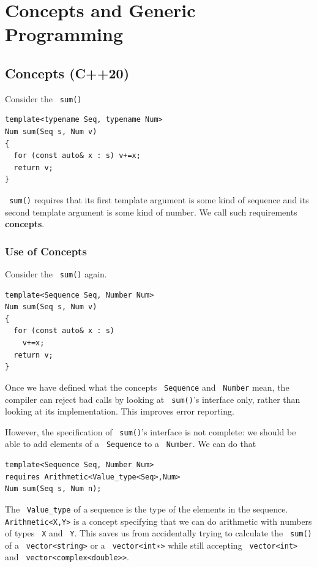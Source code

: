 \documentclass[11pt]{article}
\let\OldTexttt\texttt
\renewcommand{\texttt}[1]{\OldTexttt{\color{MidnightBlue} #1}}
\begin{document}
\section{Concepts and Generic Programming}
\label{sec:orgb7b7f2f}
\subsection{Concepts (C++20)}
\label{sec:orgdc95c83}
Consider the \texttt{sum()}
\begin{verbatim}
template<typename Seq, typename Num>
Num sum(Seq s, Num v)
{
  for (const auto& x : s) v+=x;
  return v;
}
\end{verbatim}

\texttt{sum()} requires that its first template argument is some kind of sequence and its second template
argument is some kind of number. We call such requirements \textbf{concepts}.
\subsubsection{Use of Concepts}
\label{sec:orgf0196c3}
Consider the \texttt{sum()} again.
\begin{verbatim}
template<Sequence Seq, Number Num>
Num sum(Seq s, Num v)
{
  for (const auto& x : s)
    v+=x;
  return v;
}
\end{verbatim}

Once we have defined what the concepts \texttt{Sequence} and \texttt{Number} mean, the compiler can reject bad
calls by looking at \texttt{sum()}'s interface only, rather than looking at its implementation. This
improves error reporting.

However, the specification of \texttt{sum()}'s interface is not complete: we should be able to add
elements of a \texttt{Sequence} to a \texttt{Number}. We can do that
\begin{verbatim}
template<Sequence Seq, Number Num>
requires Arithmetic<Value_type<Seq>,Num>
Num sum(Seq s, Num n);
\end{verbatim}

The \texttt{Value\_type} of a sequence is the type of the elements in the sequence. \texttt{Arithmetic<X,Y>} is a
concept specifying that we can do arithmetic with numbers of types \texttt{X} and \texttt{Y}. This saves us from
accidentally trying to calculate the \texttt{sum()} of a \texttt{vector<string>} or a \texttt{vector<int∗>} while still
accepting \texttt{vector<int>} and \texttt{vector<complex<double>>}.
\end{document}
